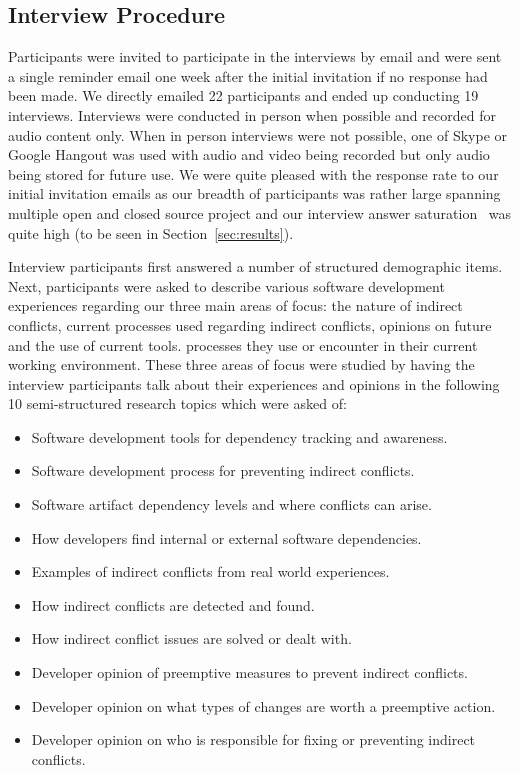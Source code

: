 \documentclass[conference]{IEEEtran}
\newcommand{\totalCategories}{10}
\begin{document}
\subsection{Interview Procedure}

Participants were invited to participate in the interviews by email and were sent a single reminder email one week
after the initial invitation if no response had been made. We directly emailed 22 participants and ended up conducting
19 interviews. Interviews were conducted in person when possible and recorded for audio content only. When in person
interviews were not possible, one of Skype or Google Hangout was used with audio and video being recorded but only
audio being stored for future use. We were quite pleased with the response rate to our initial invitation emails as
our breadth of participants was rather large spanning multiple open and closed source project and our interview 
answer saturation~\cite{Guest:2006:SAP} was quite high (to be seen in Section~\ref{sec:results}).

Interview participants first answered a number of structured demographic items. Next, participants were 
asked to describe various software development experiences regarding our three main areas of focus: the nature
of indirect conflicts, current processes used regarding indirect conflicts, opinions on future and the use of
current tools. processes they use or encounter in their current working environment. These three areas of focus
were studied by having the interview participants talk about their experiences and opinions in the following
\totalCategories{} semi-structured research topics which were asked of:

\begin{itemize}
\item Software development tools for dependency tracking and awareness.
\item Software development process for preventing indirect conflicts.
\item Software artifact dependency levels and where conflicts can arise.
\item How developers find internal or external software dependencies.
\item Examples of indirect conflicts from real world experiences.
\item How indirect conflicts are detected and found.
\item How indirect conflict issues are solved or dealt with.
\item Developer opinion of preemptive measures to prevent indirect conflicts.
\item Developer opinion on what types of changes are worth a preemptive action.
\item Developer opinion on who is responsible for fixing or preventing indirect conflicts.
\end{itemize}
\end{document}
